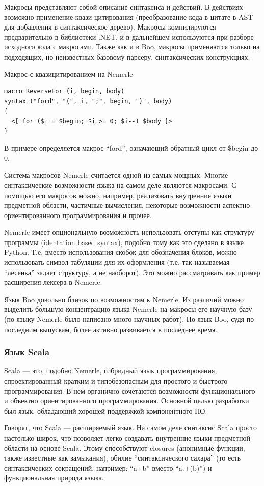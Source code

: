 \documentclass[a4paper,12pt,titlepage]{extarticle}
\begin{document}
Макросы представляют собой описание синтаксиса и действий. В действиях
возможно применение квази-цитирования (преобразование кода в цитате в AST для
добавления в синтаксическое дерево). Макросы компилируются предварительно в
библиотеки .NET, и в дальнейшем используются при разборе исходного кода с
макросами. Также как и в Boo, макросы применяются только на подходящих, но
неизвестных базовому парсеру, синтаксических конструкциях.

Макрос с квазицитированием на Nemerle
\begin{verbatim}
macro ReverseFor (i, begin, body) 
syntax ("ford", "(", i, ";", begin, ")", body)
{
  <[ for ($i = $begin; $i >= 0; $i--) $body ]>
}
\end{verbatim}
В примере определяется макрос ``ford'', означающий обратный цикл от \$begin до
0.

Система макросов Nemerle считается одной из самых мощных. Многие
синтаксические возможности языка на самом деле являются макросами. С помощью
его макросов можно, например, реализовать внутренние языки предметной области,
частичные вычисления, некоторые возможности аспектно-ориентированного
программирования и прочее.

Nemerle имеет опциональную возможность использовать отступы как структуру
программы (identation based syntax), подобно тому как это сделано в языке
Python. Т.е. вместо использования скобок для обозначения блоков, можно
использовать символ табуляции для их оформления (т.е. так называемая
``лесенка'' задает структуру, а не наоборот). Это можно рассматривать как
пример расширения лексера в Nemerle.

Язык Boo довольно близок по возможностям к Nemerle. Из различий можно выделить
б\'{о}льшую концентрацию языка Nemerle на макросы его научную базу
(по языку Nemerle было написано много научных работ). Но язык Boo, судя по
последним выпускам, более активно развивается в последнее время.

\subsubsection*{Язык Scala}
Scala — это, подобно Nemerle, гибридный язык программирования, спроектированный
кратким и типобезопасным для простого и быстрого программирования. В нем органично
сочетаются возможности функционального и объектно ориентированного
программирования. Основной целью разработки был язык, обладающий хорошей
поддержкой компонентного ПО.

Говорят, что Scala --- расширяемый язык. На самом деле синтаксис Scala просто
настолько широк, что позволяет легко создавать внутренние языки предметной
области на основе Scala. Этому способствуют closures (анонимные функции, также
известные как замыкания), обилие ``синтаксического сахара'' (то есть
синтаксических сокращений, например: ``a+b'' вместо ``a.+(b)'') и
функциональная природа языка.
\end{document}

